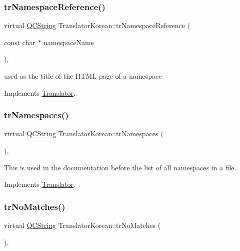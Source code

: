 \subsubsection{\texorpdfstring{trNamespaceReference()}{trNamespaceReference()}}
{\footnotesize\ttfamily virtual \mbox{\hyperlink{class_q_c_string}{Q\+C\+String}} Translator\+Korean\+::tr\+Namespace\+Reference (\begin{DoxyParamCaption}\item[{const char $\ast$}]{namespace\+Name }\end{DoxyParamCaption})\hspace{0.3cm}{\ttfamily [inline]}, {\ttfamily [virtual]}}

used as the title of the H\+T\+ML page of a namespace 

Implements \mbox{\hyperlink{class_translator}{Translator}}.

\mbox{\label{class_translator_korean_a3a7eff64086f6f9222fa568850dbbd99}} 
\subsubsection{\texorpdfstring{trNamespaces()}{trNamespaces()}}
{\footnotesize\ttfamily virtual \mbox{\hyperlink{class_q_c_string}{Q\+C\+String}} Translator\+Korean\+::tr\+Namespaces (\begin{DoxyParamCaption}{ }\end{DoxyParamCaption})\hspace{0.3cm}{\ttfamily [inline]}, {\ttfamily [virtual]}}

This is used in the documentation before the list of all namespaces in a file. 

Implements \mbox{\hyperlink{class_translator}{Translator}}.

\mbox{\label{class_translator_korean_a988e494a80995269b735242a3a4150ae}} 
\subsubsection{\texorpdfstring{trNoMatches()}{trNoMatches()}}
{\footnotesize\ttfamily virtual \mbox{\hyperlink{class_q_c_string}{Q\+C\+String}} Translator\+Korean\+::tr\+No\+Matches (\begin{DoxyParamCaption}{ }\end{DoxyParamCaption})\hspace{0.3cm}{\ttfamily [inline]}, {\ttfamily [virtual]}}

